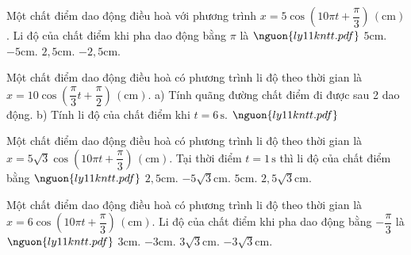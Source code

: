 \begin{ex}
Một chất điểm dao động điều hoà với phương trình $x=5\cos\left(10\pi t+\dfrac{\pi}{3}\right)\,(\mathrm{cm})$. Li độ của chất điểm khi pha dao động bằng $\pi$ là $\nguon{ly11 kntt.pdf}$
\choice
{$5 \mathrm{cm}$.}
{\True $-5 \mathrm{cm}$.}
{$2,5 \mathrm{cm}$.}
{$-2,5 \mathrm{cm}$.}
\end{ex}

\begin{ex}
Một chất điểm dao động điều hoà có phương trình li độ theo thời gian là $x=10\cos\left(\dfrac{\pi}{3}t+\dfrac{\pi}{2}\right)\,(\mathrm{cm})$. a) Tính quãng đường chất điểm đi được sau 2 dao động. b) Tính li độ của chất điểm khi $t=6\,\mathrm{s}$. $\nguon{ly11 kntt.pdf}$
\choiceTF

\end{ex}

\begin{ex}
Một chất điểm dao động điều hoà có phương trình li độ theo thời gian là $x=5\sqrt{3}\cos\left(10\pi t+\dfrac{\pi}{3}\right)\,(\mathrm{cm})$. Tại thời điểm $t=1\,\mathrm{s}$ thì li độ của chất điểm bằng $\nguon{ly11 kntt.pdf}$
\choice
{$2,5 \mathrm{cm}$.}
{$-5\sqrt{3} \mathrm{cm}$.}
{$5 \mathrm{cm}$.}
{\True $2,5\sqrt{3} \mathrm{cm}$.}
\end{ex}

\begin{ex}
Một chất điểm dao động điều hoà có phương trình li độ theo thời gian là $x=6\cos\left(10\pi t+\dfrac{\pi}{3}\right)\,(\mathrm{cm})$. Li độ của chất điểm khi pha dao động bằng $-\dfrac{\pi}{3}$ là $\nguon{ly11 kntt.pdf}$
\choice
{\True $3 \mathrm{cm}$.}
{$-3 \mathrm{cm}$.}
{$3\sqrt{3} \mathrm{cm}$.}
{$-3\sqrt{3} \mathrm{cm}$.}
\end{ex}

